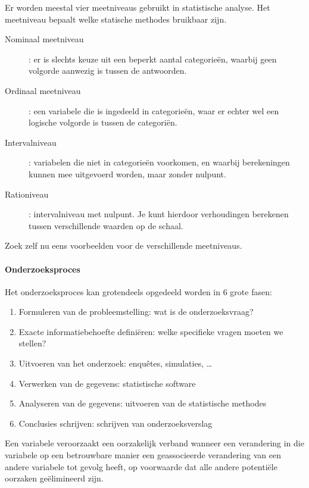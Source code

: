 Er worden meestal vier meetniveaus gebruikt in statistische analyse. Het meetniveau bepaalt welke statische methodes bruikbaar zijn. 
\begin{description}
	\item [Nominaal meetniveau] : er is slechts keuze uit een beperkt aantal categorie\"en, waarbij geen volgorde aanwezig is tussen de antwoorden.
	\item [Ordinaal meetniveau] : een variabele die is ingedeeld in categorie\"en, waar er echter wel een logische volgorde is tussen de categori\"en. 
	\item [Intervalniveau] : variabelen die niet in categorie\"en voorkomen, en waarbij berekeningen kunnen mee uitgevoerd worden, maar zonder nulpunt.
	\item [Rationiveau] : intervalniveau met nulpunt. Je kunt hierdoor verhoudingen berekenen tussen verschillende waarden op de schaal.
\end{description}

\begin{exercise}
	Zoek zelf nu eens voorbeelden voor de verschillende meetniveaus.
\end{exercise}

\paragraph{Onderzoeksproces}
Het onderzoeksproces kan grotendeels opgedeeld worden in 6 grote fasen:
\begin{enumerate}
	\item Formuleren van de probleemstelling: wat is de onderzoeksvraag?
	\item Exacte informatiebehoefte defini\"eren: welke specifieke vragen moeten we stellen?
	\item Uitvoeren van het onderzoek: enqu\^etes, simulaties, \dots
	\item Verwerken van de gegevens: statistische software
	\item Analyseren van de gegevens: uitvoeren van de statistische methodes
	\item Conclusies schrijven: schrijven van onderzoeksverslag
\end{enumerate}

\begin{definition}
 Een variabele veroorzaakt een oorzakelijk verband wanneer een verandering in die variabele op een betrouwbare manier een geassocieerde verandering van een andere variabele tot gevolg heeft, op voorwaarde dat alle andere potenti\"ele oorzaken ge\"elimineerd zijn.
\end{definition}

